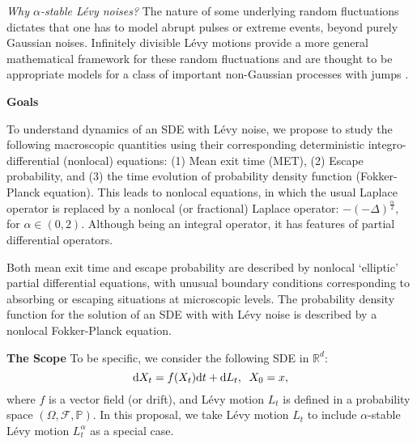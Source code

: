 \documentclass[11pt]{article}
\newcommand{\R}{{\mathbb R}}
\begin{document}
{\it Why $\alpha$-stable L\'evy noises?} \hspace*{0.3in}
The nature of some underlying random fluctuations dictates that
one has to model abrupt pulses or extreme events, beyond purely
Gaussian noises. Infinitely divisible
L\'evy motions provide a more general mathematical framework
for these random fluctuations and are thought
to be appropriate models for a class of important
non-Gaussian processes with jumps \cite{Sato-99, Bertoin-98, taqqu}.

\textbf{Goals}

To understand   dynamics of an SDE with L\'evy noise, we propose
to study the following macroscopic quantities using their corresponding
deterministic integro-differential (nonlocal) equations:
(1) Mean exit time (MET), (2) Escape probability, and  (3)   the time evolution of probability density function (Fokker-Planck equation).
This leads to nonlocal equations,
in which the usual Laplace operator is replaced
by a nonlocal (or fractional) Laplace operator:  $-(-\Delta)^{\frac{\alpha}2  }$, for $\alpha \in (0, 2)$.
Although being an integral operator,
it has features of partial differential operators.


Both mean exit time and escape probability are described by nonlocal `elliptic' partial differential equations, with unusual boundary conditions corresponding to absorbing or escaping situations at microscopic levels.
The probability density function for the solution of an SDE with  with L\'evy noise is   described by a nonlocal   Fokker-Planck equation.


\textbf{The Scope}
To be specific, we consider the following SDE in $\R^d$:
\begin{equation} \label{sde}
{\rm d}X_{t}  =  f (X_{t})  {\rm d}t +  {\rm d} L_{t}, \;\; X_0 = x,
\end{equation}
 where $f$ is a vector field (or drift), and   L\'evy motion $L_{t}$  is   defined in a probability space $(\Omega, \mathcal{F}, \mathbb{P})$.  In this proposal,  we take L\'evy motion $L_{t}$  to include $\alpha$-stable L\'evy motion $L^\alpha_{t}$ as a special case.
\end{document}
